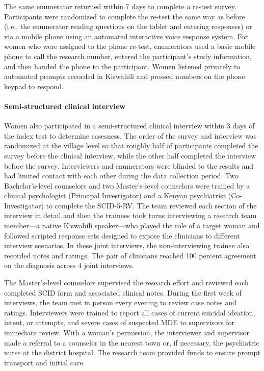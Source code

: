 \documentclass[man,natbib,longtable]{apa6}\usepackage[]{graphicx}\usepackage[]{color}
\begin{document}
The same enumerator returned within 7 days to complete a re-test survey. Participants were randomized to complete the re-test the same way as before (i.e., the enumerator reading questions on the tablet and entering responses) or via a mobile phone using an automated interactive voice response system. For women who were assigned to the phone re-test, enumerators used a basic mobile phone to call the research number, entered the participant's study information, and then handed the phone to the participant. Women listened privately to automated prompts recorded in Kiswahili and pressed numbers on the phone keypad to respond.

\paragraph{Semi-structured clinical interview}

Women also participated in a semi-structured clinical interview within 3 days of the index test to determine casesness. The order of the survey and interview was randomized at the village level so that roughly half of participants completed the survey before the clinical interview, while the other half completed the interview before the survey. Interviewers and enumerators were blinded to the results and had limited contact with each other during the data collection period. Two Bachelor's-level counselors and two Master's-level counselors were trained by a clinical psychologist (Principal Investigator) and a Kenyan psychiatrist (Co-Investigator) to complete the SCID-5-RV. The team reviewed each section of the interview in detail and then the trainees took turns interviewing a research team member---a native Kiswahili speaker---who played the role of a target woman and followed scripted response sets designed to expose the clinicians to different interview scenarios. In these joint interviews, the non-interviewing trainee also recorded notes and ratings. The pair of clinicians reached 100 percent agreement on the diagnosis across 4 joint interviews.

The Master's-level counselors supervised the research effort and reviewed each completed SCID form and associated clinical notes. During the first week of interviews, the team met in person every evening to review case notes and ratings. Interviewers were trained to report all cases of current suicidal ideation, intent, or attempts, and severe cases of suspected MDE to supervisors for immediate review. With a woman's permission, the interviewer and supervisor made a referral to a counselor in the nearest town or, if necessary, the psychiatric nurse at the district hospital. The research team provided funds to ensure prompt transport and initial care.
\end{document}
